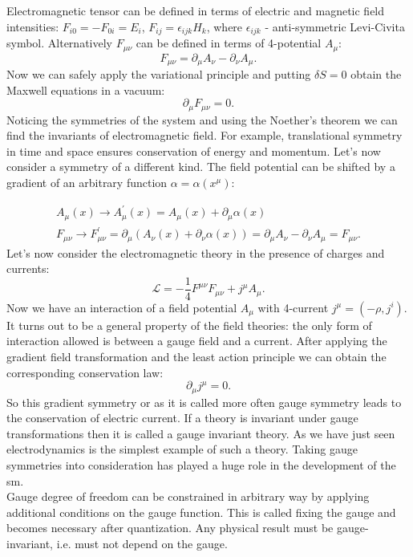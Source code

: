 Electromagnetic tensor can be defined in terms of electric and magnetic field intensities: $F_{i0}=-F_{0i} = E_i$, $F_{ij} = \epsilon_{ijk}H_k$, where $\epsilon_{ijk}$ - anti-symmetric Levi-Civita symbol. Alternatively $F_{\mu \nu}$ can be defined in terms of 4-potential $A_{\mu}$:
 \begin{equation}
F_{\mu \nu} = \partial_{\mu}A_{\nu} - \partial_{\nu}A_{\mu}.
\end{equation}
Now we can safely apply the variational principle and putting $\delta S=0$ obtain the Maxwell equations in a vacuum:
 \begin{equation}
\partial_{\mu}F_{\mu \nu} = 0.
\end{equation}
Noticing the symmetries of the system and using the Noether's theorem\cite{Noether1918} we can find the invariants of electromagnetic field. For example, translational symmetry in time and space ensures conservation of energy and momentum. Let's now consider a symmetry of a different kind. The field potential can be shifted by a gradient of an arbitrary function $\alpha=\alpha(x^\mu)$:

\begin{equation}
\begin{array}{lcl} 
A_{\mu}(x) \rightarrow A^{\prime}_{\mu}(x)  = A_{\mu}(x)+\partial_{\mu}\alpha(x)  \\ 
F_{\mu \nu} \rightarrow F^{\prime}_{\mu \nu}  = \partial_{\mu}(A_{\nu}(x)+\partial_{\nu}\alpha(x))=\partial_{\mu}A_{\nu} - \partial_{\nu}A_{\mu}=F_{\mu \nu}.
\end{array} 
\end{equation}
Let's now consider the electromagnetic theory in the presence of charges and currents:
 \begin{equation}
\mathcal{L} = -\frac{1}{4} F^{\mu \nu}F_{\mu \nu} + j^{\mu}A_{\mu}.
\end{equation}
Now we have an interaction of a field potential $A_{\mu}$ with 4-current $j^{\mu}=(-\rho,j^{i})$. It turns out to be a general property of the field theories: the only form of interaction allowed is between a gauge field and a current.  After applying the gradient field transformation and the least action principle we can obtain the corresponding conservation law:
\begin{equation}
\partial_{\mu}j^{\mu}=0.
\end{equation}
 So this gradient symmetry\cite{bogol} or as it is called more often gauge symmetry leads to the conservation of electric current. If a theory is invariant under gauge transformations then it is called a gauge invariant theory. As we have just seen electrodynamics is the simplest example of such a theory. Taking gauge symmetries into consideration \cite{YangMills} has played a huge role in the development of the \gls{sm}.\\
 Gauge degree of freedom can be constrained in arbitrary way by applying additional conditions on the gauge function. This is called fixing the gauge and becomes necessary after quantization. Any physical result must be gauge-invariant, i.e. must not depend on the gauge. 

